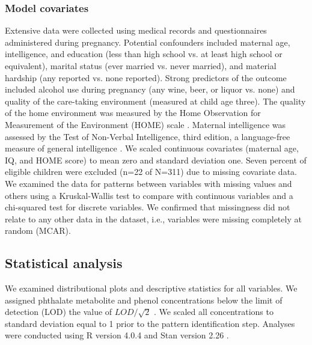 \subsubsection{Model covariates}
\label{sec:cov}
Extensive data were collected using medical records and questionnaires administered during pregnancy. Potential confounders included maternal age, intelligence, and education (less than high school vs. at least high school or equivalent), marital status (ever married vs. never married), and material hardship (any reported vs. none reported). Strong predictors of the outcome included alcohol use during pregnancy (any wine, beer, or liquor vs. none) and quality of the care-taking environment (measured at child age three). The quality of the home environment was measured by the Home Observation for Measurement of the Environment (HOME) scale \cite{caldwellhome}. Maternal intelligence was assessed by the Test of Non-Verbal Intelligence, third edition, a language-free measure of general intelligence \cite{brown1990test}. We scaled continuous covariates (maternal age, IQ, and HOME score) to mean zero and standard deviation one. Seven percent of eligible children were excluded (n=22 of N=311) due to missing covariate data. We examined the data for patterns between variables with missing values and others using a Kruskal-Wallis test to compare with continuous variables and a chi-squared test for discrete variables. We confirmed that missingness did not relate to any other data in the dataset, i.e., variables were missing completely at random (MCAR).

\subsection{Statistical analysis}
We examined distributional plots and descriptive statistics for all variables. We assigned phthalate metabolite and phenol concentrations below the limit of detection (LOD) the value of $LOD/\sqrt{2}$ \cite{hornung1990estimation}. We scaled all concentrations to standard deviation equal to 1 prior to the pattern identification step. Analyses were conducted using R version 4.0.4 and Stan version 2.26 \cite{rrr, gelman2015stan}. 

